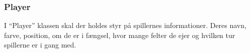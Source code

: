 \subsubsection{Player}
I “Player” klassen skal der holdes styr på spillernes informationer. Deres navn, farve, position, om de er i fængsel, hvor mange felter de ejer og hvilken tur spillerne er i gang med. 